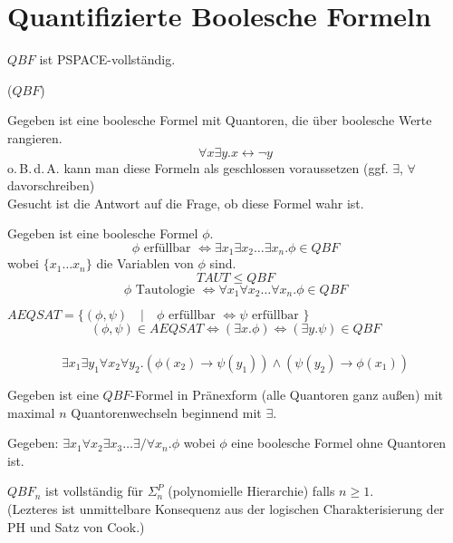 




\section{Quantifizierte Boolesche Formeln}


\begin{satz}
    $QBF$ ist PSPACE-vollständig.

\end{satz}


 ($QBF$)

Gegeben ist eine boolesche Formel mit Quantoren, die über boolesche Werte rangieren.
$$ \forall x \exists y . x \leftrightarrow \neg y  $$
o.\,B.\,d.\,A. kann man diese Formeln als geschlossen voraussetzen (ggf. $\exists$, $\forall$ davorschreiben)
\\
Gesucht ist die Antwort auf die Frage, ob diese Formel wahr ist.



Gegeben ist eine boolesche Formel $\phi$.
$$ \phi \text{ erfüllbar } \Longleftrightarrow \exists x_1 \exists x_2 \dots \exists x_n . \phi \in QBF $$
wobei $\{ x_1 \dots x_n \}$ die Variablen von $\phi$ sind.
\\
$$ TAUT \leq QBF $$
$$ \phi \text{ Tautologie } \Longleftrightarrow \forall x_1 \forall x_2 \dots \forall x_n . \phi \in QBF $$


$AEQSAT = \{ (\phi, \psi) \quad | \quad \phi \text{ erfüllbar } \Leftrightarrow \psi \text{ erfüllbar } \}$
$$(\phi, \psi) \in AEQSAT \Longleftrightarrow (\exists x . \phi ) \Leftrightarrow (\exists y. \psi) \in QBF $$
\\
$$\exists x_1 \exists y_1 \forall x_2 \forall y_2 . (\phi(x_2) \rightarrow \psi(y_1)) \land (\psi(y_2) \rightarrow \phi(x_1))$$






Gegeben ist eine $QBF$-Formel in Pränexform (alle Quantoren ganz außen) mit maximal $n$ Quantorenwechseln beginnend mit $\exists$.

Gegeben: $\exists x_1 \forall x_2 \exists x_3 \dots \exists/\forall x_n . \phi$ wobei $\phi$ eine boolesche Formel ohne Quantoren ist.

$QBF_n$ ist vollständig für $\Sigma_n^P$ (polynomielle Hierarchie) falls $n \geq 1$.
\\
(Lezteres ist unmittelbare Konsequenz aus der logischen Charakterisierung der PH und Satz von Cook.)




